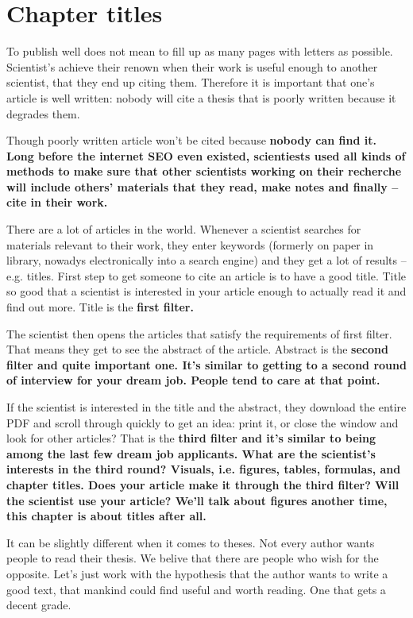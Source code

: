 {{\section{Chapter titles}

To publish well does not mean to fill up as many pages with letters as possible. Scientist's achieve their renown when their work is useful enough to another scientist, that they end up citing them. Therefore it is important that one's article is well written: nobody will cite a thesis that is poorly written because it degrades them.

Though poorly written article won't be cited because \bf nobody can find it\rm. Long before the internet SEO even existed, scientiests used all kinds of methods to make sure that other scientists working on their recherche will include others' materials that they read, make notes and finally -- cite in their work.

There are a lot of articles in the world. Whenever a scientist searches for materials relevant to their work, they enter keywords (formerly on paper in library, nowadys electronically into a search engine) and they get a lot of results -- e.g. titles. First step to get someone to cite an article is to have a good title. Title so good that a scientist is interested in your article enough to actually read it and find out more. Title is the \bf first filter\rm.


The scientist then opens the articles that satisfy the requirements of first filter. That means they get to see the abstract of the article. Abstract is the \bf second filter \rm and quite important one. It's similar to getting to a second round of interview for your dream job. People tend to care at that point.

If the scientist is interested in the title and the abstract, they download the entire PDF and scroll through quickly to get an idea: print it, or close the window and look for other articles? That is the \bf third filter \rm and it's similar to being among the last few dream job applicants. What are the scientist's interests in the third round? Visuals, i.e. figures, tables, formulas, and chapter titles. Does your article make it through the third filter? Will the scientist use your article? We'll talk about figures another time, this chapter is about titles after all.

It can be slightly different when it comes to theses. Not every author wants people to read their thesis. We belive that there are people who wish for the opposite. Let's just work with the hypothesis that the author wants to write a good text, that mankind could find useful and worth reading. One that gets a decent grade.


}}
